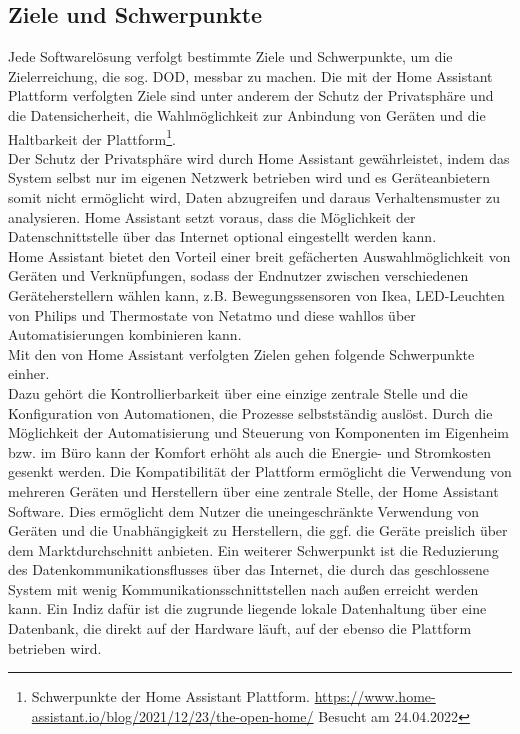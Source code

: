 \subsection{Ziele und Schwerpunkte}
    Jede Softwarelösung verfolgt bestimmte Ziele und Schwerpunkte, um die Zielerreichung, die sog. \ac{DOD}, messbar zu machen. Die mit 
    der Home Assistant Plattform verfolgten Ziele sind unter anderem der Schutz der Privatsphäre und die Datensicherheit, die Wahlmöglichkeit zur Anbindung von 
    Geräten und die Haltbarkeit der Plattform\footnote{Schwerpunkte der Home Assistant Plattform. \url{https://www.home-assistant.io/blog/2021/12/23/the-open-home/} Besucht am 24.04.2022}. 
    \\
    \linebreak
    Der Schutz der Privatsphäre wird durch Home Assistant gewährleistet, indem das System selbst nur im eigenen Netzwerk betrieben wird und es 
    Geräteanbietern somit nicht ermöglicht wird, Daten abzugreifen und daraus Verhaltensmuster zu analysieren. Home Assistant setzt voraus, dass die 
    Möglichkeit der Datenschnittstelle über das Internet optional eingestellt werden kann. 
    \\
    Home Assistant bietet den Vorteil einer breit gefächerten Auswahlmöglichkeit von Geräten und Verknüpfungen, sodass der Endnutzer zwischen verschiedenen 
    Geräteherstellern wählen kann, z.B. Bewegungssensoren von Ikea, LED-Leuchten von Philips und Thermostate von Netatmo und diese wahllos über 
    Automatisierungen kombinieren kann. 
    \\
    Mit den von Home Assistant verfolgten Zielen gehen folgende Schwerpunkte einher.
    \\
    \linebreak
    \linebreak
    Dazu gehört die Kontrollierbarkeit über eine einzige zentrale Stelle und die Konfiguration von 
    Automationen, die Prozesse selbstständig auslöst. Durch die Möglichkeit der Automatisierung und Steuerung von Komponenten im Eigenheim 
    bzw. im Büro kann der Komfort erhöht als auch die Energie- und Stromkosten gesenkt werden. Die Kompatibilität der Plattform 
    ermöglicht die Verwendung von mehreren Geräten und Herstellern über eine zentrale Stelle, der Home Assistant Software. Dies ermöglicht 
    dem Nutzer die uneingeschränkte Verwendung von Geräten und die Unabhängigkeit zu Herstellern, die ggf. die Geräte preislich über dem 
    Marktdurchschnitt anbieten. Ein weiterer Schwerpunkt ist die Reduzierung des Datenkommunikationsflusses über das Internet, die durch das 
    geschlossene System mit wenig Kommunikationsschnittstellen nach außen erreicht werden kann. Ein Indiz dafür ist die zugrunde liegende 
    lokale Datenhaltung über eine Datenbank, die direkt auf der Hardware läuft, auf der ebenso die Plattform betrieben wird. 

